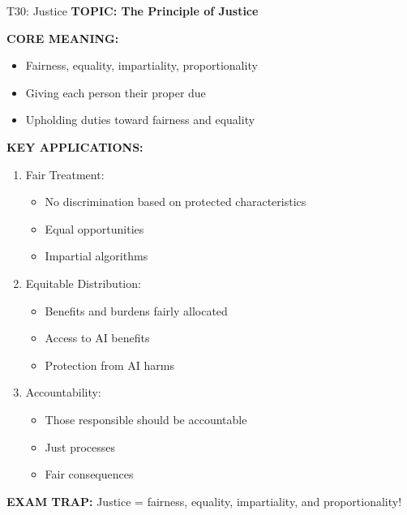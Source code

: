 \documentclass[8pt]{beamer}
\begin{document}
	\begin{frame}{T30: Justice}
		\fontsize{6.5}{7.5}\selectfont
		\textbf{TOPIC: The Principle of Justice}
		
		\vspace{0.1cm}
		\textbf{CORE MEANING:}
		\begin{itemize}
			\item Fairness, equality, impartiality, proportionality
			\item Giving each person their proper due
			\item Upholding duties toward fairness and equality
		\end{itemize}
		
		\vspace{0.1cm}
		\textbf{KEY APPLICATIONS:}
		\begin{enumerate}
			\item \textcolor{myblue}{Fair Treatment:}
			\begin{itemize}
				\item No discrimination based on protected characteristics
				\item Equal opportunities
				\item Impartial algorithms
			\end{itemize}
			\item \textcolor{myblue}{Equitable Distribution:}
			\begin{itemize}
				\item Benefits and burdens fairly allocated
				\item Access to AI benefits
				\item Protection from AI harms
			\end{itemize}
			\item \textcolor{myblue}{Accountability:}
			\begin{itemize}
				\item Those responsible should be accountable
				\item Just processes
				\item Fair consequences
			\end{itemize}
		\end{enumerate}
		
		\textcolor{myred}{\textbf{EXAM TRAP:}} Justice = \textcolor{myblue}{fairness, equality, impartiality, and proportionality}!
	\end{frame}
	
\end{document}
